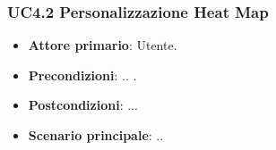 \subsubsection{UC4.2 Personalizzazione Heat Map}
\begin{itemize}
	\item \textbf{Attore primario}: Utente.
	\item \textbf{Precondizioni}: .. .
	\item \textbf{Postcondizioni}: ...
	\item \textbf{Scenario principale}: ..
\end{itemize}